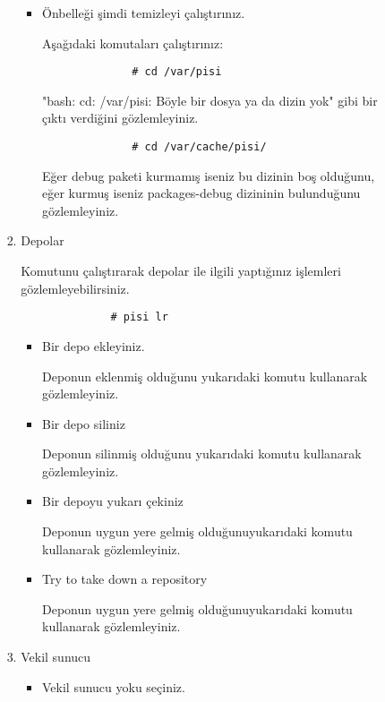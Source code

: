 \documentclass[a4paper,10pt]{article}
\begin{document}
\begin{enumerate}
\begin{enumerate}
\begin{enumerate}
\begin{enumerate}
\begin{itemize}
		      \item Önbelleği şimdi temizleyi çalıştırınız.

		      Aşağıdaki komutaları çalıştırınız: 
		      \begin{verbatim}
		      # cd /var/pisi
		      \end{verbatim}

		      "bash: cd: /var/pisi: Böyle bir dosya ya da dizin yok" gibi bir çıktı verdiğini gözlemleyiniz.
	    
		      \begin{verbatim}
		      # cd /var/cache/pisi/
		      \end{verbatim}
		
		      Eğer debug paketi kurmamış iseniz bu dizinin boş olduğunu, eğer kurmuş iseniz packages-debug dizininin bulunduğunu gözlemleyiniz.
		   
                \end{itemize} 
                \item Depolar

		 Komutunu çalıştırarak depolar ile ilgili yaptığınız işlemleri gözlemleyebilirsiniz.
		    \begin{verbatim}
		      # pisi lr
		    \end{verbatim}
                \begin{itemize}
                    \item Bir depo ekleyiniz.
		    
		    Deponun eklenmiş olduğunu yukarıdaki komutu kullanarak gözlemleyiniz.

                    \item Bir depo siliniz
		
		    Deponun silinmiş olduğunu yukarıdaki komutu kullanarak gözlemleyiniz.
                    \item Bir depoyu yukarı çekiniz
 
		     Deponun uygun yere gelmiş olduğunuyukarıdaki komutu kullanarak gözlemleyiniz.
                    \item Try to take down a repository 

                    Deponun uygun yere gelmiş olduğunuyukarıdaki komutu kullanarak gözlemleyiniz.
                \end{itemize}
                \item Vekil sunucu
                \begin{itemize}
                    \item  Vekil sunucu yoku seçiniz.


\end{itemize}
\end{enumerate}
\end{enumerate}
\end{enumerate}
\end{enumerate}
\end{document}
